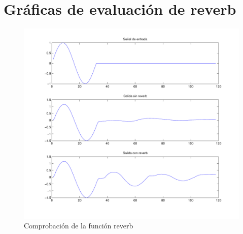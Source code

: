 \documentclass[a4paper,12pt]{article}
\begin{document}
\section{Gráficas de evaluación de reverb}\label{sec:resultadosreverb}
\begin{figure}[hbt]
\begin{center}
\includegraphics[width=\textwidth]{img/test_reverb.pdf} 
\caption{Comprobación de la función reverb} \label{fig:reverbgraph}
\end{center}
\end{figure}

\clearpage
\end{document}
